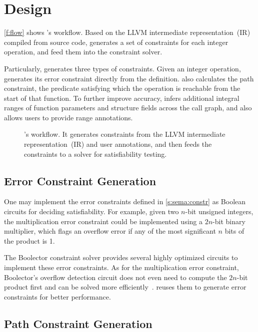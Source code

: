 \section{Design}
\label{s:gen}

\autoref{f:flow} shows \sys's workflow.  Based on the LLVM intermediate
representation~(IR) compiled from source code, \sys generates a set
of constraints for each integer operation, and feed them into the
constraint solver.

Particularly, \sys generates three types of constraints.
%
Given an integer operation, \sys generates its error constraint
directly from the definition.
%
\sys also calculates the path constraint, the predicate satisfying
which the operation is reachable from the start of that function.
%
To further improve accuracy, \sys infers additional integral ranges
of function parameters and structure fields across the call graph,
and also allows users to provide range annotations.

\begin{figure}
\centering
\resizebox{0.9\linewidth}{!}{

}
\caption{\sys's workflow.  It generates constraints from the LLVM
intermediate representation~(IR) and user annotations, and then feeds
the constraints to a solver for satisfiability testing.}
\label{f:flow}
\end{figure}

\subsection{Error Constraint Generation}

One may implement the error constraints defined in \autoref{s:sema:constr}
as Boolean circuits for deciding satisfiability.  For example, given
two $n$-bit unsigned integers, the multiplication error constraint
could be implemented using a $2n$-bit binary multiplier, which flags
an overflow error if any of the most significant $n$ bits of the
product is 1.

The Boolector constraint solver provides several highly optimized
circuits to implement these error constraints.  As for the
multiplication error constraint, Boolector's overflow detection
circuit does not even need to compute the $2n$-bit product first
and can be solved more
efficiently~\cite[\chapterautorefname~3.5]{brummayer:phd}.  \sys
reuses them to generate error constraints for better performance.

\subsection{Path Constraint Generation}

